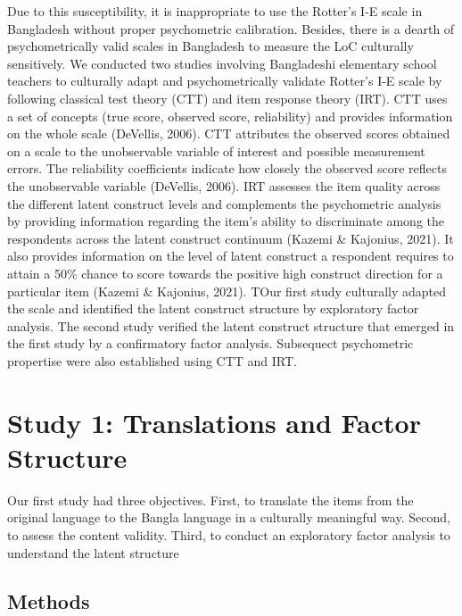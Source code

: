 \documentclass[
  man]{apa6}
\begin{document}
Due to this susceptibility, it is inappropriate to use the Rotter's I-E scale in Bangladesh without proper psychometric calibration. Besides, there is a dearth of psychometrically valid scales in Bangladesh to measure the LoC culturally sensitively. We conducted two studies involving Bangladeshi elementary school teachers to culturally adapt and psychometrically validate Rotter's I-E scale by following classical test theory (CTT) and item response theory (IRT). CTT uses a set of concepts (true score, observed score, reliability) and provides information on the whole scale (DeVellis, 2006). CTT attributes the observed scores obtained on a scale to the unobservable variable of interest and possible measurement errors. The reliability coefficients indicate how closely the observed score reflects the unobservable variable (DeVellis, 2006). IRT assesses the item quality across the different latent construct levels and complements the psychometric analysis by providing information regarding the item's ability to discriminate among the respondents across the latent construct continuum (Kazemi \& Kajonius, 2021). It also provides information on the level of latent construct a respondent requires to attain a 50\% chance to score towards the positive high construct direction for a particular item (Kazemi \& Kajonius, 2021). TOur first study culturally adapted the scale and identified the latent construct structure by exploratory factor analysis. The second study verified the latent construct structure that emerged in the first study by a confirmatory factor analysis. Subsequect psychometric propertise were also established using CTT and IRT.

\hypertarget{study-1-translations-and-factor-structure}{%
\section{Study 1: Translations and Factor Structure}\label{study-1-translations-and-factor-structure}}

Our first study had three objectives. First, to translate the items from the original language to the Bangla language in a culturally meaningful way. Second, to assess the content validity. Third, to conduct an exploratory factor analysis to understand the latent structure

\hypertarget{methods}{%
\subsection{Methods}\label{methods}}
\end{document}
